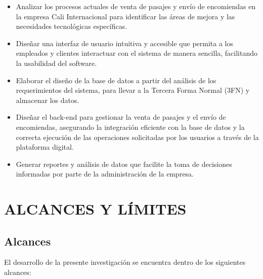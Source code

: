 		\begin{itemize}[label=$\bullet$, left=0cm, labelsep = 1.05cm, topsep = 0pt, parsep = 0pt]
			
			\item Analizar los procesos actuales de venta de pasajes y envío de encomiendas en la empresa Cali Internacional para identificar las áreas de mejora y las necesidades tecnológicas específicas.
			\item Diseñar una interfaz de usuario intuitiva y accesible que permita a los empleados y clientes interactuar con el sistema de manera sencilla, facilitando la usabilidad del software.
			\item Elaborar el diseño de la base de datos a partir del análisis de los requerimientos del sistema, para llevar a la Tercera Forma Normal (3FN) y almacenar los datos.
			\item Diseñar el back-end para gestionar la venta de pasajes y el envío de encomiendas, asegurando la integración eficiente con la base de datos y la correcta ejecución de las operaciones solicitadas por los usuarios a través de la plataforma digital.    
			\item Generar reportes y análisis de datos que facilite la toma de decisiones informadas por parte de la administración de la empresa.
			
		\end{itemize}
		
\section{ALCANCES Y LÍMITES}
	\subsection{Alcances}
		
		El desarrollo de la presente investigación se encuentra dentro de los siguientes alcances:
		
